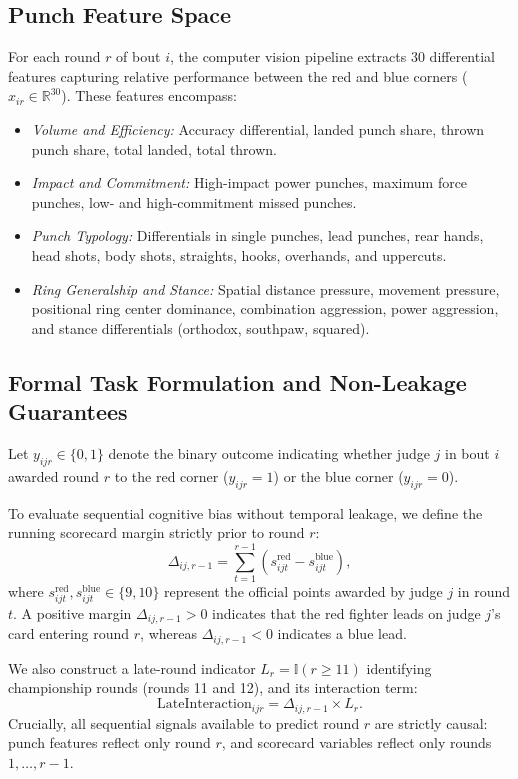 \documentclass[conference]{IEEEtran}
\begin{document}
\subsection{Punch Feature Space}
For each round $r$ of bout $i$, the computer vision pipeline extracts 30 differential features capturing relative performance between the red and blue corners ($x_{ir} \in \mathbb{R}^{30}$). These features encompass:
\begin{itemize}
    \item \textit{Volume and Efficiency:} Accuracy differential, landed punch share, thrown punch share, total landed, total thrown.
    \item \textit{Impact and Commitment:} High-impact power punches, maximum force punches, low- and high-commitment missed punches.
    \item \textit{Punch Typology:} Differentials in single punches, lead punches, rear hands, head shots, body shots, straights, hooks, overhands, and uppercuts.
    \item \textit{Ring Generalship and Stance:} Spatial distance pressure, movement pressure, positional ring center dominance, combination aggression, power aggression, and stance differentials (orthodox, southpaw, squared).
\end{itemize}

\subsection{Formal Task Formulation and Non-Leakage Guarantees}
Let $y_{ijr} \in \{0, 1\}$ denote the binary outcome indicating whether judge $j$ in bout $i$ awarded round $r$ to the red corner ($y_{ijr} = 1$) or the blue corner ($y_{ijr} = 0$).

To evaluate sequential cognitive bias without temporal leakage, we define the running scorecard margin strictly prior to round $r$:
\begin{equation}
\Delta_{ij,r-1} = \sum_{t=1}^{r-1} \left( s_{ijt}^{\text{red}} - s_{ijt}^{\text{blue}} \right),
\end{equation}
where $s_{ijt}^{\text{red}}, s_{ijt}^{\text{blue}} \in \{9, 10\}$ represent the official points awarded by judge $j$ in round $t$. A positive margin $\Delta_{ij,r-1} > 0$ indicates that the red fighter leads on judge $j$'s card entering round $r$, whereas $\Delta_{ij,r-1} < 0$ indicates a blue lead.

We also construct a late-round indicator $L_r = \mathbb{I}(r \ge 11)$ identifying championship rounds (rounds 11 and 12), and its interaction term:
\begin{equation}
\text{LateInteraction}_{ijr} = \Delta_{ij,r-1} \times L_r.
\end{equation}
Crucially, all sequential signals available to predict round $r$ are strictly causal: punch features reflect only round $r$, and scorecard variables reflect only rounds $1, \dots, r-1$.
\end{document}
